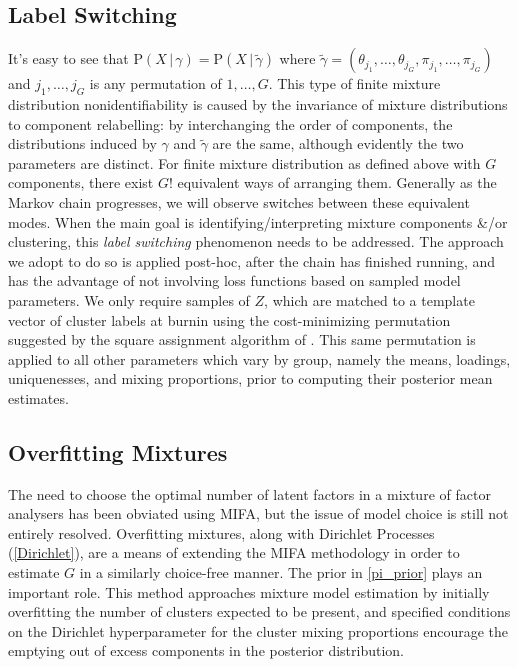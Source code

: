 \documentclass[a4paper,12pt,fleqn]{article}
\numberwithin{equation}{section}
\def\given{\,|\,}
\begin{document}
\subsection[Label Switching]{Label Switching}
It's easy to see that $\mathrm{P}\left(X\given\gamma\right) = \mathrm{P}\left(X\given\tilde\gamma\right)$ where $\tilde\gamma = \left(\theta_{j_1},\ldots,\theta_{j_G},\pi_{j_1},\ldots,\pi_{j_G}\right)$ and $j_1,\ldots,j_G$ is any permutation of $1,\ldots,G$. This type of finite mixture distribution nonidentifiability is caused by the invariance of mixture distributions to component relabelling: by interchanging the order of components, the distributions induced by $\gamma$ and $\tilde{\gamma}$ are the same, although evidently the two parameters are distinct. For finite mixture distribution as defined above with $G$ components, there exist $G!$ equivalent ways of arranging them. Generally as the Markov chain progresses, we will observe switches between these equivalent modes. When the main goal is identifying/interpreting mixture components \&/or clustering, this \textit{label switching} phenomenon needs to be addressed. The approach we adopt to do so is applied post-hoc, after the chain has finished running, and has the advantage of not involving loss functions based on sampled model parameters. We only require samples of $Z$, which are matched to a template vector of cluster labels at burnin using the cost-minimizing permutation suggested by the square assignment algorithm of \cite{CarpToth1980}. This same permutation is applied to all other parameters which vary by group, namely the means, loadings, uniquenesses, and mixing proportions, prior to computing their posterior mean estimates.

\subsection[Overfitting Mixtures]{Overfitting Mixtures}
The need to choose the optimal number of latent factors in a mixture of factor analysers has been obviated using MIFA, but the issue of model choice is still not entirely resolved. Overfitting mixtures, along with Dirichlet Processes (\ref{Dirichlet}), are a means of extending the MIFA methodology in order to estimate $G$ in a similarly choice-free manner. The prior in \ref{pi_prior}  plays an important role. This method approaches mixture model estimation by initially overfitting the number of clusters expected to be present, and specified conditions on the Dirichlet hyperparameter for the cluster mixing proportions encourage the emptying out of excess components in the posterior distribution. 
\end{document}

